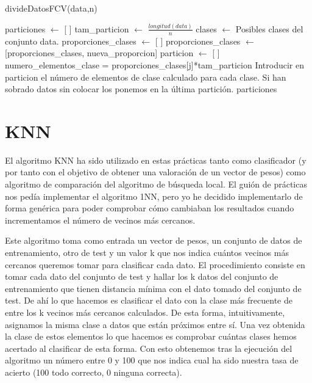 \documentclass[12pt,a4paper]{article}
\begin{document}
	\begin{algorithm}
		\caption{divideDatosFCV(data,n)}
		\begin{algorithmic}
			\STATE particiones $\leftarrow$ [ ]
			\STATE tam\_particion $\leftarrow$ $\frac{longitud(data)}{n}$
			\STATE clases $\leftarrow$ Posibles clases del conjunto data.
			\STATE proporciones\_clases $\leftarrow$ [ ]
				\STATE proporciones\_clases $\leftarrow$ [proporciones\_clases, nueva\_proporcion]
			\ENDFOR
				\STATE particion $\leftarrow$ [ ]
					\STATE numero\_elementos\_clase = proporciones\_clases[j]*tam\_particion
						\STATE Introducir en particion el número de elementos de clase calculado para cada clase.
					\ENDFOR
				\ENDFOR
			\ENDFOR
			\STATE Si han sobrado datos sin colocar los ponemos en la última partición.
			\RETURN particiones
		\end{algorithmic}
	\end{algorithm}
	
	\newpage

	\section{KNN}
	\label{sec:knn}

	El algoritmo KNN ha sido utilizado en estas prácticas tanto como clasificador (y por tanto con el objetivo de obtener una valoración de un vector de pesos) como algoritmo de comparación del algoritmo de búsqueda local.
	El guión de prácticas nos pedía implementar el algoritmo 1NN, pero yo he decidido implementarlo de forma genérica para poder comprobar cómo cambiaban los resultados cuando incrementamos el número de vecinos más cercanos.
	
	Este algoritmo toma como entrada un vector de pesos, un conjunto de datos de entrenamiento, otro de test y un valor k que nos indica cuántos vecinos más cercanos queremos tomar para clasificar cada dato. 
	El procedimiento consiste en tomar cada dato del conjunto de test y hallar los k datos del conjunto de entrenamiento que tienen distancia mínima con el dato tomado del conjunto de test. De ahí lo que hacemos es clasificar el dato con la clase más frecuente de entre los k vecinos más cercanos calculados. De esta forma, intuitivamente, asignamos la misma clase a datos que están próximos entre sí. Una vez obtenida la clase de estos elementos lo que hacemos es comprobar cuántas clases hemos acertado al clasificar de esta forma. Con esto obtenemos tras la ejecución del algoritmo un número entre 0 y 100 que nos indica cual ha sido nuestra tasa de acierto (100 todo correcto, 0 ninguna correcta).
	
\end{document}
